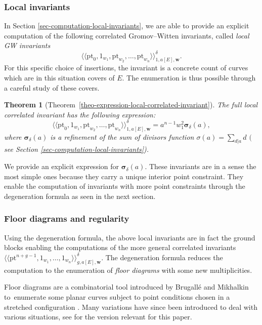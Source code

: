 \documentclass[pdftex]{sigma}
\newcommand{\pt}{\mathrm{pt}}
\newcommand{\bfw}{ {\boldsymbol w} }
\numberwithin{equation}{section}
\newtheorem*{theom}{Theorem}
\theoremstyle{definition}
\begin{document}
\subsubsection{Local invariants} In Section \ref{sec-computation-local-invariants}, we are able to provide an explicit computation of the following correlated Gromov--Witten invariants, called \textit{local GW invariants}
\[ \langle\langle \pt_0,1_{w_1},\pt_{w_2},\dots,\pt_{w_n} \rangle\rangle^\delta_{1,a[E],\bfw}. \]
For this specific choice of insertions, the invariant is a concrete count of curves which are in this situation covers of $E$. The enumeration is thus possible through a careful study of these covers.

\begin{theom}[Theorem~\ref{theo-expression-local-correlated-invariant}]
 The full local correlated invariant has the following expression:
 \[ \langle\langle\pt_0,1_{w_1},\pt_{w_2},\dots,\pt_{w_n}\rangle\rangle^\delta_{1,a[E],\bfw} = a^{n-1}w_1^2\boldsymbol{\sigma}_\delta(a), \]
 where $\boldsymbol{\sigma}_\delta(a)$ is a refinement of the sum of divisors function $\sigma(a)=\sum_{d|a}d$ $($see Section {\rm\ref{sec-computation-local-invariants})}.
\end{theom}

We provide an explicit expression for $\boldsymbol{\sigma}_\delta(a)$. These invariants are in a sense the most simple ones because they carry a unique interior point constraint. They enable the computation of invariants with more point constraints through the degeneration formula as seen in the next section.

\subsubsection{Floor diagrams and regularity}
Using the degeneration formula, the above local invariants are in fact the ground blocks enabling the computations of the more general correlated invariants $\langle\langle\pt^{n+g-1},1_{w_1},\dots,1_{w_n} \rangle\rangle^\delta_{g,a[E],\bfw}$. The degeneration formula reduces the computation to the enumeration of \textit{floor diagrams} with some new multiplicities.

Floor diagrams are a combinatorial tool introduced by Brugall\'e and Mikhalkin to~enumerate some planar curves subject to point conditions chosen in a stretched configuration \mbox{\cite{brugalle2007enumeration,brugalle2008floor}}. Many variations have since been introduced to deal with various situations, see \cite{blomme2022floor} for the version relevant for this paper.
\end{document}
